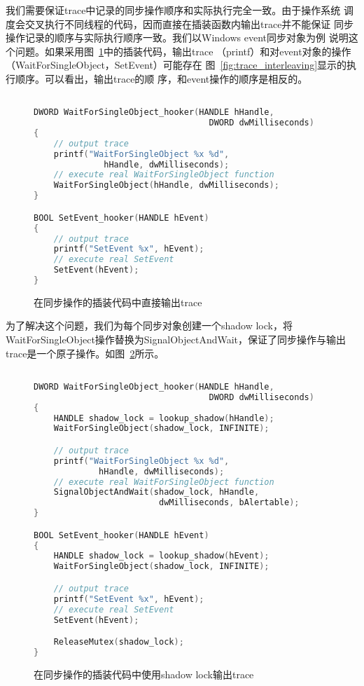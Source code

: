 我们需要保证trace中记录的同步操作顺序和实际执行完全一致。由于操作系统
调度会交叉执行不同线程的代码，因而直接在插装函数内输出trace并不能保证
同步操作记录的顺序与实际执行顺序一致。我们以Windows event同步对象为例
说明这个问题。如果采用图~\ref{fig:trace_direct}中的插装代码，输出trace
（printf）和对event对象的操作（WaitForSingleObject，SetEvent）可能存在
图~\ref{fig:trace_interleaving}显示的执行顺序。可以看出，输出trace的顺
序，和event操作的顺序是相反的。

\begin{figure}
\centering
\begin{lstlisting}[language=C++]

DWORD WaitForSingleObject_hooker(HANDLE hHandle,
                                   DWORD dwMilliseconds)
{
    // output trace
    printf("WaitForSingleObject %x %d",
              hHandle, dwMilliseconds);
    // execute real WaitForSingleObject function
    WaitForSingleObject(hHandle, dwMilliseconds);
}

BOOL SetEvent_hooker(HANDLE hEvent)
{
    // output trace
    printf("SetEvent %x", hEvent);
    // execute real SetEvent
    SetEvent(hEvent);
}
\end{lstlisting}
\caption{在同步操作的插装代码中直接输出trace}
\label{fig:trace_direct}
\end{figure}

为了解决这个问题，我们为每个同步对象创建一个shadow lock，将
WaitForSingleObject操作替换为SignalObjectAndWait，保证了同步操作与输出
trace是一个原子操作。如图~\ref{fig:trace_shadowlock}所示。

\begin{figure}
\centering
\begin{lstlisting}[language=C++]

DWORD WaitForSingleObject_hooker(HANDLE hHandle, 
                                   DWORD dwMilliseconds)
{
    HANDLE shadow_lock = lookup_shadow(hHandle);
    WaitForSingleObject(shadow_lock, INFINITE);

    // output trace
    printf("WaitForSingleObject %x %d", 
             hHandle, dwMilliseconds);
    // execute real WaitForSingleObject function
    SignalObjectAndWait(shadow_lock, hHandle, 
                         dwMilliseconds, bAlertable);
}

BOOL SetEvent_hooker(HANDLE hEvent)
{
    HANDLE shadow_lock = lookup_shadow(hEvent);
    WaitForSingleObject(shadow_lock, INFINITE);

    // output trace
    printf("SetEvent %x", hEvent);
    // execute real SetEvent
    SetEvent(hEvent);

    ReleaseMutex(shadow_lock);
}

\end{lstlisting}
\caption{在同步操作的插装代码中使用shadow lock输出trace}
\label{fig:trace_shadowlock}
\end{figure}

